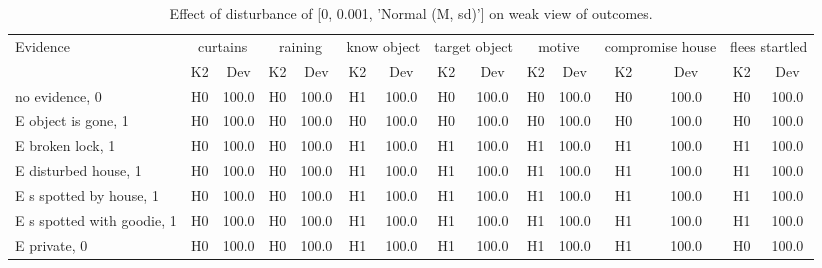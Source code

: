 \begin{table}\begin{tabular}{l|cc|cc|cc|cc|cc|cc|cc}\toprule\multirow{2}{*}{Evidence} & \multicolumn{2}{c}{curtains}& \multicolumn{2}{c}{raining}& \multicolumn{2}{c}{know object}& \multicolumn{2}{c}{target object}& \multicolumn{2}{c}{motive}& \multicolumn{2}{c}{compromise house}& \multicolumn{2}{c}{flees startled}\\& {K2} & {Dev}& {K2} & {Dev}& {K2} & {Dev}& {K2} & {Dev}& {K2} & {Dev}& {K2} & {Dev}& {K2} & {Dev}\\\midrule
no evidence, 0 & H0&100.0&H0&100.0&H1&100.0&H0&100.0&H0&100.0&H0&100.0&H0&100.0\\E object is gone, 1 & H0&100.0&H0&100.0&H0&100.0&H0&100.0&H0&100.0&H0&100.0&H0&100.0\\E broken lock, 1 & H0&100.0&H0&100.0&H1&100.0&H1&100.0&H1&100.0&H1&100.0&H1&100.0\\E disturbed house, 1 & H0&100.0&H0&100.0&H1&100.0&H1&100.0&H1&100.0&H1&100.0&H1&100.0\\E s spotted by house, 1 & H0&100.0&H0&100.0&H1&100.0&H1&100.0&H1&100.0&H1&100.0&H1&100.0\\E s spotted with goodie, 1 & H0&100.0&H0&100.0&H1&100.0&H1&100.0&H1&100.0&H1&100.0&H1&100.0\\E private, 0 & H0&100.0&H0&100.0&H1&100.0&H1&100.0&H1&100.0&H1&100.0&H0&100.0\\\bottomrule\end{tabular}\caption{Effect of disturbance of [0, 0.001, 'Normal (M, sd)'] on weak view of outcomes.}\end{table}